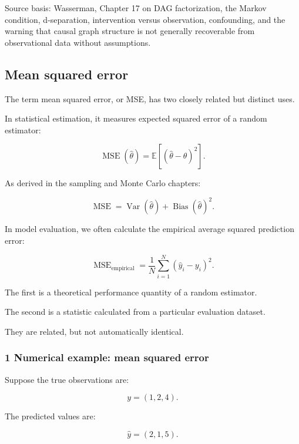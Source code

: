 Source basis: Wasserman, Chapter 17 on DAG factorization, the Markov condition, d-separation, intervention versus observation, confounding, and the warning that causal graph structure is not generally recoverable from observational data without assumptions.

\subsection{Mean squared error}\label{02-foundations-ii-ch030-mean-squared-error}

\hypertarget{02-foundations-ii-ch030-mean-squared-error}{}

The term mean squared error, or MSE, has two closely related but distinct uses.

In statistical estimation, it measures expected squared error of a random estimator:

\[
 \boxed{ \operatorname{MSE}(\widehat\theta) = \mathbb E[(\widehat\theta-\theta)^2] }.
\]

As derived in the sampling and Monte Carlo chapters:

\[
 \boxed{ \operatorname{MSE} = \operatorname{Var}(\widehat\theta) + \operatorname{Bias}(\widehat\theta)^2 }.
\]

In model evaluation, we often calculate the empirical average squared prediction error:

\[
 \boxed{ \operatorname{MSE}_{\mathrm{empirical}} = \frac1N\sum_{i=1}^{N} (\hat y_i-y_i)^2 }.
\]

The first is a theoretical performance quantity of a random estimator.

The second is a statistic calculated from a particular evaluation dataset.

They are related, but not automatically identical.

\subsubsection{1 Numerical example: mean squared error}\label{02-foundations-ii-ch030-numerical-example-mean-squared-error}

\hypertarget{02-foundations-ii-ch030-numerical-example-mean-squared-error}{}

Suppose the true observations are:

\[
 y=(1,2,4).
\]

The predicted values are:

\[
 \hat y=(2,1,5).
\]

